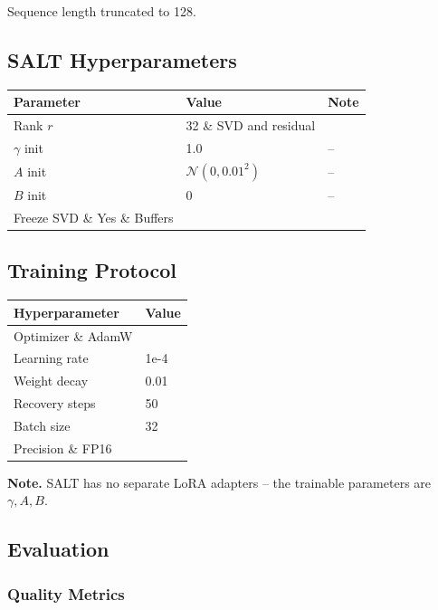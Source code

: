 Sequence length truncated to 128.

\subsection{SALT Hyperparameters}

\begin{table}[H]
\centering
\small
\begin{tabular}{lll}
\toprule
\textbf{Parameter} & \textbf{Value} & \textbf{Note} \\
\midrule
Rank $r$ & 32 \& SVD and residual \\
$\gamma$ init & 1.0 & -- \\
$A$ init & $\mathcal{N}(0, 0.01^2)$ & -- \\
$B$ init & 0 & -- \\
Freeze SVD \& Yes \& Buffers \\
\bottomrule
\end{tabular}
\end{table}

\subsection{Training Protocol}

\begin{table}[H]
\centering
\small
\begin{tabular}{ll}
\toprule
\textbf{Hyperparameter} & \textbf{Value} \\
\midrule
Optimizer \& AdamW \\
Learning rate & 1e-4 \\
Weight decay & 0.01 \\
Recovery steps & 50 \\
Batch size & 32 \\
Precision \& FP16 \\
\bottomrule
\end{tabular}
\end{table}

\textbf{Note.} SALT has no separate LoRA adapters -- the trainable parameters are 
$\gamma, A, B$.

\subsection{Evaluation}

\subsubsection{Quality Metrics}

